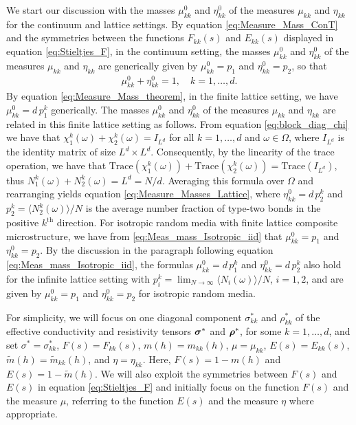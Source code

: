 \documentclass{cmslatex}
\newcommand\bsig{\mbox{\boldmath${\sigma}$}}
\newcommand\brho{\mbox{\boldmath${\rho}$}}
\begin{document}
We start our discussion with the masses $\mu_{kk}^0$ and $\eta_{kk}^0$ of
the measures $\mu_{kk}$ and $\eta_{kk}$ for the continuum and 
lattice settings. By equation \eqref{eq:Measure_Mass_ConT} and  
the symmetries between the functions $F_{kk}(s)$ and $E_{kk}(s)$
displayed in equation \eqref{eq:Stieltjes_F}, in the continuum setting,
the masses $\mu_{kk}^0$ and $\eta_{kk}^0$ of the measures $\mu_{kk}$ and
$\eta_{kk}$ are generically given by $\mu_{kk}^0=p_1$ and $\eta_{kk}^0=p_2$, so that
%
\begin{align}\label{eq:Measure_Masses_Lattice}
  \mu_{kk}^0+\eta_{kk}^0=1, \quad  k=1,\ldots,d.
\end{align}
%
By equation \eqref{eq:Measure_Mass_theorem}, in
the finite lattice setting, we have $\mu_{kk}^0=d\,p_1^k$ generically. The masses
$\mu_{kk}^0$ and $\eta_{kk}^0$ of the measures $\mu_{kk}$ and $\eta_{kk}$ are
related in this finite lattice setting as follows. From equation
\eqref{eq:block_diag_chi} we have that $\chi_1^k(\omega)+\chi_2^k(\omega)=I_{L^d}$ for
all $k=1,\ldots,d$ and $\omega\in\Omega$, where $I_{L^d}$ is the identity matrix of
size $L^d\times L^d$. Consequently, by the linearity of the trace
operation, we have that
$\text{Trace}(\chi_1^k(\omega))+\text{Trace}(\chi_2^k(\omega))=\text{Trace}(I_{L^d})$,     
thus $N_1^k(\omega)+N_2^k(\omega)=L^d=N/d$. Averaging this formula
over $\Omega$ and rearranging yields equation \eqref{eq:Measure_Masses_Lattice},
where $\eta_{kk}^0=d\,p_2^k$ and $p_2^k=\langle N_2^k(\omega)\rangle/N$ is the average
number fraction of type-two bonds in the positive $k^{\text{th}}$
direction. For isotropic random media with finite lattice composite
microstructure, we have from 
\eqref{eq:Meas_mass_Isotropic_iid} that $\mu_{kk}^0=p_1$ and
$\eta_{kk}^0=p_2$. By the discussion in the paragraph following equation 
\eqref{eq:Meas_mass_Isotropic_iid}, the formulas $\mu_{kk}^0=d\,p_1^k$
and $\eta_{kk}^0=d\,p_2^k$ also hold for the infinite lattice setting
with $p_i^k=\lim_{N\to\infty}\langle N_i(\omega)\rangle/N$, $i=1,2$, and are given by
$\mu_{kk}^0=p_1$ and $\eta_{kk}^0=p_2$ for isotropic random media.  


 
For simplicity, we will focus on one diagonal component $\sigma^*_{kk}$ and
$\rho^*_{kk}$ of the effective conductivity and resistivity tensors
$\bsig^*$ and $\brho^*$, for some $k=1,\ldots,d$, and set $\sigma^*=\sigma_{kk}^*$,
$F(s)=F_{kk}(s)$, $m(h)=m_{kk}(h)$, $\mu=\mu_{kk}$, $E(s)=E_{kk}(s)$,
$\tilde{m}(h)=\tilde{m}_{kk}(h)$, and $\eta=\eta_{kk}$. 
Here,
$F(s)=1-m(h)$ and $E(s)=1-\tilde{m}(h)$.
We will also exploit the symmetries between
$F(s)$ and $E(s)$ in equation \eqref{eq:Stieltjes_F} and initially 
focus on the function $F(s)$ and the measure $\mu$, referring to the
function $E(s)$ and the measure $\eta$ where appropriate. 
\end{document}
